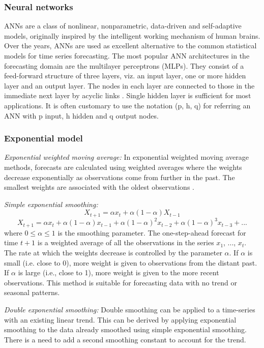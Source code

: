 \subsubsection{Neural networks}
ANNs are a class of nonlinear, nonparametric, data-driven and self-adaptive models, originally inspired by the intelligent working mechanism of human brains. Over the years, ANNs are used as excellent alternative to the common statistical models for time series forecasting. The most popular ANN architectures in the forecasting domain are the multilayer perceptrons (MLPs). They consist of a feed-forward structure of three layers, viz. an input layer, one or more hidden layer and an output layer. The nodes in each layer are connected to those in the immediate next layer by acyclic links . Single hidden layer is sufficient for most applications. It is often customary to use the notation (p, h, q) for referring an ANN with p input, h hidden and q output nodes.

\subsubsection{Exponential model}
\textit{Exponential weighted moving average:}
In exponential weighted moving average methods, forecasts are calculated using weighted averages where the weights decrease exponentially as observations come from further in the past. The smallest weights are associated with the oldest observations \cite{Forecasting_OTexts} \cite{StatSoft} \cite{STAT510}.

\textit{Simple exponential smoothing:}
	$$X_{t+1}=\alpha x_t +\alpha(1-\alpha)X_{t-1}$$
	$$X_{t+1}=\alpha x_t +\alpha(1-\alpha)x_{t-1}+\alpha(1-\alpha)^2x_{t-2}+\alpha(1-\alpha)^3x_{t-3}+...$$
where $0\leq \alpha \leq 1$ is the smoothing parameter. The one-step-ahead forecast for time $t+1$ is a weighted average of all the observations in the series $x_1$, ..., $x_t$. The rate at which the weights decrease is controlled by the parameter $\alpha$. If $\alpha$ is small (i.e. close to 0), more weight is given to observations from the distant past. If $\alpha$ is large (i.e., close to 1), more weight is given to the more recent observations. This method is suitable for forecasting data with no trend or seasonal patterns.

\textit{Double exponential smoothing:}
Double smoothing can be applied to a time-series with an existing linear trend. This can be derived by applying exponential smoothing to the data already smoothed using simple exponential smoothing. There is a need to add a second smoothing constant to account for the trend.

